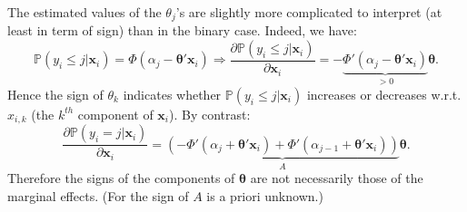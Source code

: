 \documentclass[
  12pt,
]{book}
\theoremstyle{definition}
\theoremstyle{definition}
\theoremstyle{definition}
\theoremstyle{definition}
\theoremstyle{remark}
\begin{document}
The estimated values of the \(\theta_j\)'s are slightly more complicated to interpret (at least in term of sign) than in the binary case. Indeed, we have:
\[
\mathbb{P}(y_i \le j | \mathbf{x}_i) = \Phi(\alpha_{j} - \boldsymbol\theta'\mathbf{x}_i) \Rightarrow \frac{\partial \mathbb{P}(y_i \le j | \mathbf{x}_i)}{\partial\mathbf{x}_i} =- \underbrace{\Phi'(\alpha_{j} - \boldsymbol\theta'\mathbf{x}_i)}_{>0}\boldsymbol\theta.
\]
Hence the sign of \(\theta_k\) indicates whether \(\mathbb{P}(y_i \le j | \mathbf{x}_i)\) increases or decreases w.r.t. \(x_{i,k}\) (the \(k^{th}\) component of \(\mathbf{x}_i\)). By contrast:
\[
\frac{\partial \mathbb{P}(y_i = j | \mathbf{x}_i)}{\partial\mathbf{x}_i} = \underbrace{\left(-\Phi'(\alpha_{j} + \boldsymbol\theta'\mathbf{x}_i)+\Phi'(\alpha_{j-1} + \boldsymbol\theta'\mathbf{x}_i)\right)}_{A}\boldsymbol\theta.
\]
Therefore the signs of the components of \(\boldsymbol\theta\) are not necessarily those of the marginal effects. (For the sign of \(A\) is a priori unknown.)
\end{document}
